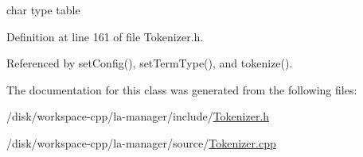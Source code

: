 char type table 



Definition at line 161 of file Tokenizer.h.

Referenced by setConfig(), setTermType(), and tokenize().

The documentation for this class was generated from the following files:\begin{CompactItemize}
\item 
/disk/workspace-cpp/la-manager/include/\hyperlink{Tokenizer_8h}{Tokenizer.h}\item 
/disk/workspace-cpp/la-manager/source/\hyperlink{Tokenizer_8cpp}{Tokenizer.cpp}\end{CompactItemize}
